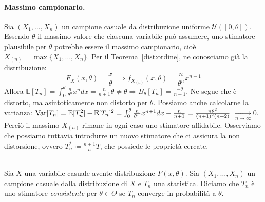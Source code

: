 \paragraph{Massimo campionario.} Sia \((X_1,\dotsc,X_n)\) un campione casuale da distribuzione uniforme \(\mathcal{U}([0,\theta])\). Essendo \(\theta\) il massimo valore che ciascuna variabile può assumere, uno stimatore plausibile
per \(\theta\) potrebbe essere il massimo campionario, cioè \(X_{(n)} = \max\lbrace X_1,\dotsc,X_n\rbrace\). Per il Teorema~\ref{dist:ordine}, ne conosciamo già la distribuzione:
\begin{equation*}
  F_X(x,\theta) = \frac{x}{\theta} \implies
  f_{X_{(n)}}(x,\theta) = \frac{n}{\theta^n}x^{n-1}
\end{equation*} 
Allora $\mathbb{E}[T_n]=\int_0^\theta \frac{n}{\theta^n}x^n dx=\frac{n}{n+1}\theta \neq \theta\Longrightarrow B_{\theta}[T_n]=\frac{-\theta}{n+1}$. 
Ne segue che è distorto, ma asintoticamente non distorto per $\theta$. 
Possiamo anche calcolarne la varianza: $\operatorname{Var}[T_n]=\mathbb{E}[T_n^2]-\mathbb{E}[T_n]^2=\int_0^\theta \frac{n}{\theta^n}x^{n+1} dx -\frac{n}{n+1}=\frac{n\theta^2}{(n+1)^2(n+2)}$
$\xrightarrow[n\rightarrow \infty]{}0$. 
Perciò il massimo $X_{(n)}$ rimane in ogni caso uno stimatore affidabile. Osserviamo che possiamo tuttavia introdurre un nuovo stimatore che ci assicura la non distorsione, ovvero $T_n^*\coloneqq \frac{n+1}{n}T$, che possiede le proprietà cercate. \\ \\

\begin{dfn}[Consistenza]
  Sia \(X\) una variabile casuale avente distribuzione \(F(x,\theta)\).
  Sia \((X_1,\dotsc,X_n)\) un campione casuale dalla distribuzione di \(X\) e
  \(T_n\) una statistica. Diciamo che \(T_n\) è uno stimatore \emph{consistente}
  per \(\theta \in \Theta\) se %
  \(T_n\) converge in probabilità a \(\theta\).
\end{dfn}

